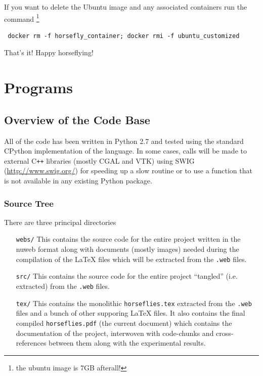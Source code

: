 \documentclass[11.5pt]{report}
\begin{document}
If you want to delete the Ubuntu image and any associated containers run the command \footnote{the ubuntu image is 7GB afterall!}
\begin{verbatim}
 docker rm -f horsefly_container; docker rmi -f ubuntu_customized
\end{verbatim}

That's it! Happy horseflying!
\part{Programs}
\chapter{Overview of the Code Base}

All of the code has been written in Python 2.7 and tested using the standard CPython
implementation of the language. In some cases, calls will be made to external C\texttt{++} 
libraries (mostly CGAL and VTK) using SWIG (\url{http://www.swig.org/})
for speeding up a slow routine or to use a function that is not available in any existing 
Python package.

\section{Source Tree}


There are three principal directories 
\begin{itemize}

 \item[\texttt{webs/}] This contains the source code for the entire project written in 
                       the nuweb format along with documents (mostly images)
                       needed during the compilation of the \LaTeX{} files which will 
                       be extracted from the \texttt{.web} files. 

 \item[\texttt{src/}] This contains the source code for the entire project ``tangled'' 
                      (i.e. extracted) from the \texttt{.web} files. 
 \item[\texttt{tex/}] This contains the monolithic \texttt{horseflies.tex} extracted 
                      from the \texttt{.web} files and a bunch 
                      of other supporing \LaTeX{} files. It also contains the final 
                      compiled \texttt{horseflies.pdf} (the current document) which 
                      contains the documentation of the project, interwoven with 
                      code-chunks and cross-references between them along with the 
                      experimental results.  
\end{itemize}  
\end{document}
